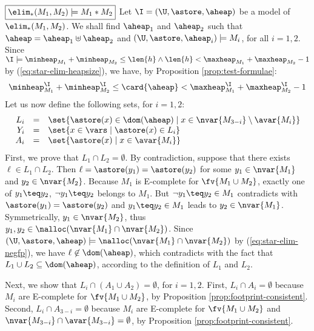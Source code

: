 {  \noindent
  $\boxed{\elim_*(M_1,M_2) \models M_1 * M_2}$ Let $\I =
  (\U,\astore,\aheap)$ be a model of $\elim_*(M_1,M_2)$. We shall find
  $\aheap_1$ and $\aheap_2$ such that $\aheap = \aheap_1 \uplus
  \aheap_2$ and $(\U,\astore,\aheap_i) \models M_i$, for all $i=1,2$.
  Since $\I \models \minheap_{M_1} + \minheap_{M_2} \leq \len{h}
  \wedge \len{h} < \maxheap_{M_1} + \maxheap_{M_2} - 1$ by
  (\ref{eq:star-elim-heapsize}), we have, by Proposition
  \ref{prop:test-formulae}:
  \begin{equation}
    \minheap^\I_{M_1} + \minheap^\I_{M_2} \leq \card{\aheap} < \maxheap^\I_{M_1} + \maxheap^\I_{M_2} - 1
    \label{eq:heap-min-max}
  \end{equation}
  Let us now define the following sets, for $i=1,2$: 
  \[\begin{array}{rcl}
  L_i & = & \set{\astore(x) \in \dom(\aheap) \mid x \in \nvar{M_{3-i}} \setminus \avar{M_i}} \\
  Y_i & = & \set{x \in \vars \mid \astore(x) \in L_i} \\
  A_i & = & \set{\astore(x) \mid x \in \avar{M_i}}
  \end{array}\]
  First, we prove that $L_1 \cap L_2 = \emptyset$. By contradiction,
  suppose that there exists $\ell \in L_1 \cap L_2$. Then $\ell =
  \astore(y_1) = \astore(y_2)$ for some $y_1 \in \nvar{M_1}$ and $y_2
  \in \nvar{M_2}$. Because $M_1$ is E-complete for $\fv{M_1 \cup
    M_2}$, exactly one of $y_1 \teq y_2$, $\neg y_1 \teq y_2$ belongs
  to $M_1$. But $\neg y_1 \teq y_2 \in M_1$ contradicts with
  $\astore(y_1) = \astore(y_2)$ and $y_1 \teq y_2 \in M_1$ leads to
  $y_2 \in \nvar{M_1}$. Symmetrically, $y_1 \in \nvar{M_2}$, thus
  $y_1,y_2 \in \nalloc(\nvar{M_1} \cap \nvar{M_2})$. Since
  $(\U,\astore,\aheap) \models \nalloc(\nvar{M_1} \cap \nvar{M_2})$ by
  (\ref{eq:star-elim-negfp}), we have $\ell \not\in \dom(\aheap)$,
  which contradicts with the fact that $L_1 \cup L_2 \subseteq
  \dom(\aheap)$, according to the definition of $L_1$ and $L_2$.

  Next, we show that $L_i \cap (A_1 \cup A_2) = \emptyset$, for $i =
  1,2$. First, $L_i \cap A_i = \emptyset$ because $M_i$ are E-complete
  for $\fv{M_1 \cup M_2}$, by Proposition
  \ref{prop:footprint-consistent}. Second, $L_i \cap A_{3-i} =
  \emptyset$ because $M_i$ are E-complete for $\fv{M_1 \cup M_2}$
  and $\nvar{M_{3-i}} \cap \avar{M_{3-i}} = \emptyset$, by Proposition
  \ref{prop:footprint-consistent}. 

}
